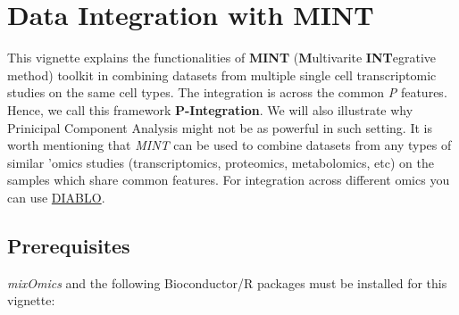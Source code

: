 \documentclass[]{book}
\theoremstyle{definition}
\theoremstyle{definition}
\theoremstyle{definition}
\theoremstyle{remark}
\begin{document}
\hypertarget{data-integration-with-mint}{%
\chapter{Data Integration with MINT}\label{data-integration-with-mint}}

This vignette explains the functionalities of \textbf{MINT}
(\textbf{M}ultivarite \textbf{INT}egrative method) \citep{mint} toolkit
in combining datasets from multiple single cell transcriptomic studies
on the same cell types. The integration is across the common \emph{P}
features. Hence, we call this framework \textbf{P-Integration}. We will
also illustrate why Prinicipal Component Analysis might not be as
powerful in such setting. It is worth mentioning that \emph{MINT} can be
used to combine datasets from any types of similar 'omics studies
(transcriptomics, proteomics, metabolomics, etc) on the samples which
share common features. For integration across different omics you can
use \href{http://mixomics.org/mixdiablo/}{DIABLO}.

\hypertarget{prerequisites}{%
\section{Prerequisites}\label{prerequisites}}

\emph{mixOmics} \citep{R-mixOmics} and the following Bioconductor/R
packages must be installed for this vignette:
\end{document}
